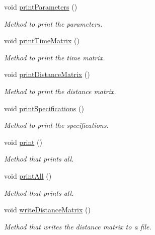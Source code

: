 \begin{DoxyCompactItemize}
void \hyperlink{class_v_r_p_t_w_instance_generator_a833edf6fd5ed003285177416850d5b9c}{printParameters} ()
\begin{DoxyCompactList}\small\item\em Method to print the parameters. \item\end{DoxyCompactList}\item 
void \hyperlink{class_v_r_p_t_w_instance_generator_a4008b8b8efdffc0955e381b4a0e21538}{printTimeMatrix} ()
\begin{DoxyCompactList}\small\item\em Method to print the time matrix. \item\end{DoxyCompactList}\item 
void \hyperlink{class_v_r_p_t_w_instance_generator_a08a6c96594d8832dd10a78256d219e19}{printDistanceMatrix} ()
\begin{DoxyCompactList}\small\item\em Method to print the distance matrix. \item\end{DoxyCompactList}\item 
void \hyperlink{class_v_r_p_t_w_instance_generator_acde2acde19e5614f1a930300c79adfd7}{printSpecifications} ()
\begin{DoxyCompactList}\small\item\em Method to print the specifications. \item\end{DoxyCompactList}\item 
void \hyperlink{class_v_r_p_t_w_instance_generator_a2d807b74e5311cc18140dab34c368f2d}{print} ()
\begin{DoxyCompactList}\small\item\em Method that prints all. \item\end{DoxyCompactList}\item 
void \hyperlink{class_v_r_p_t_w_instance_generator_a458a9b3b57e0c5dedec5490e73fe8e8e}{printAll} ()
\begin{DoxyCompactList}\small\item\em Method that prints all. \item\end{DoxyCompactList}\item 
void \hyperlink{class_v_r_p_t_w_instance_generator_a83f20670c04333f19dac1b8e7ba89a29}{writeDistanceMatrix} ()
\begin{DoxyCompactList}\small\item\em Method that writes the distance matrix to a file. \item\end{DoxyCompactList}\item 

\end{DoxyCompactItemize}
